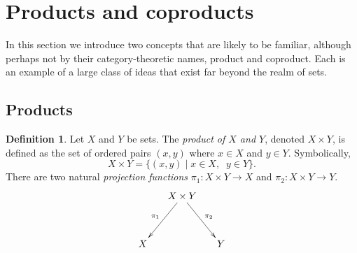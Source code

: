 \documentclass{book}
\def\to{\rightarrow}
\def\taking{\colon}
\def\|{{\;|\;}}
\theoremstyle{remark}
\theoremstyle{definition}
\newtheorem{definition}[subsubsection]{Definition}
\begin{document}

\section{Products and coproducts}\label{sec:prods and coprods in set}

In this section we introduce two concepts that are likely to be familiar, although perhaps not by their category-theoretic names, product and coproduct. Each is an example of a large class of ideas that exist far beyond the realm of sets.


\subsection{Products}\label{sec:products}

\begin{definition}

Let $X$ and $Y$ be sets. The {\em product of $X$ and $Y$}, denoted $X\times Y$, is defined as the set of ordered pairs $(x,y)$ where $x\in X$ and $y\in Y$. Symbolically, $$X\times Y=\{(x,y)\|x\in X,\;\; y\in Y\}.$$ There are two natural {\em projection functions} $\pi_1\taking X\times Y\to X$ and $\pi_2\taking X\times Y\to Y$.
$$\xymatrix@=15pt{&X\times Y\ar[ddr]^{\pi_2}\ar[ddl]_{\pi_1}\\\\X&&Y}$$

\end{definition}
\end{document}
